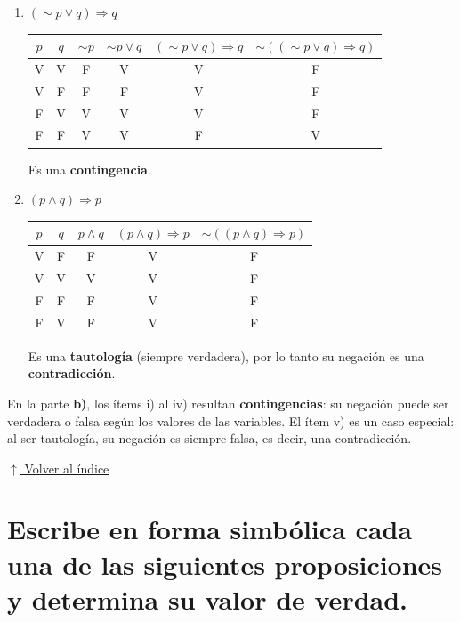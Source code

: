 \documentclass[12pt]{article}
\newcommand{\volverindice}{%
    \vspace{1em}%
    \begin{flushright}%
        \hyperlink{indice}{\small $\uparrow$ Volver al índice}%
    \end{flushright}%
}
\begin{document}
\begin{enumerate}[label=\roman*)]
    \item $(\sim p \vee q) \Rightarrow q$

    \begin{center}
    \begin{tabular}{cc|c|c|c|c}
        \toprule
        $p$ & $q$ & $\sim p$ & $\sim p \vee q$ & $(\sim p \vee q) \Rightarrow q$ & $\sim((\sim p \vee q) \Rightarrow q)$ \\
        \midrule
        V & V & F & V & V & F \\
        V & F & F & F & V & F \\
        F & V & V & V & V & F \\
        F & F & V & V & F & V \\
        \bottomrule
    \end{tabular}
    \end{center}
    Es una \textbf{contingencia}.

    \item $(p \wedge q) \Rightarrow p$

    \begin{center}
    \begin{tabular}{cc|c|c|c}
        \toprule
        $p$ & $q$ & $p \wedge q$ & $(p \wedge q) \Rightarrow p$ & $\sim((p \wedge q) \Rightarrow p)$ \\
        \midrule
        V & F & F & V & F \\
        V & V & V & V & F \\
        F & F & F & V & F \\
        F & V & F & V & F \\
        \bottomrule
    \end{tabular}
    \end{center}
    Es una \textbf{tautología} (siempre verdadera), por lo tanto su negación es una \textbf{contradicción}.
\end{enumerate}

En la parte \textbf{b)}, los ítems i) al iv) resultan \textbf{contingencias}: su negación puede ser verdadera o falsa según los valores de las variables. El ítem v) es un caso especial: al ser tautología, su negación es siempre falsa, es decir, una contradicción.

\volverindice
\newpage


\section[Forma simbólica y valor de verdad]{Escribe en forma simbólica cada una de las siguientes proposiciones y determina su valor de verdad.}
\end{document}
